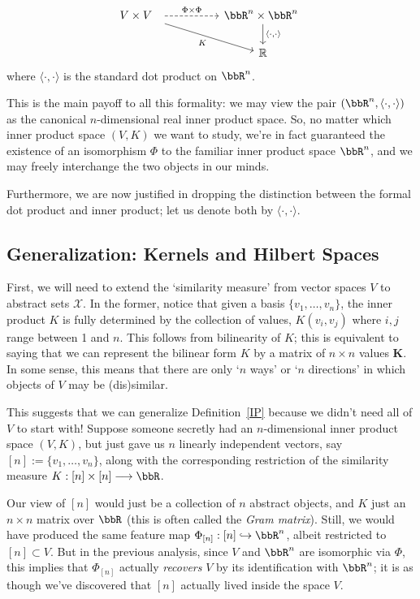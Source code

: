 \documentclass[twoside,11pt]{homework}
\renewcommand{\to}{\longrightarrow}
\begin{document}
\begin{multicols}{2}
\begin{proposition}
  \[\begin{tikzcd}
V \times V\ \  \arrow[dashed, rr, "\Phi \times \Phi"] \arrow[drr, "K"'] & & \bbR^n \times \bbR^n \ \arrow[d, "{\langle\cdot,\cdot \rangle}"] \\
& & \mathbb{R}
\end{tikzcd}
\]
  where $\langle \cdot, \cdot \rangle$ is the standard dot product on $\bbR^n$.
\end{proposition}
This is the main payoff to all this formality: we may view the pair $(\bbR^n, \langle\cdot,\cdot\rangle)$ as the canonical $n$-dimensional real inner product space. So, no matter which inner product space $(V,K)$ we want to study, we're in fact guaranteed the existence of an isomorphism $\Phi$ to the familiar inner product space $\bbR^n$, and we may freely interchange the two objects in our minds.

Furthermore, we are now justified in dropping the distinction between the formal dot product and inner product; let us denote both by $\langle \cdot, \cdot\rangle$.

\subsection{Generalization: Kernels and Hilbert Spaces}
First, we will need to extend the `similarity measure' from vector spaces $V$ to abstract sets $\mathcal{X}$. In the former, notice that given a basis $\{v_1,\dotsc, v_n\}$, the inner product $K$ is fully determined by the collection of values, $K(v_i,v_j)$ where $i,j$ range between 1 and $n$. This follows from bilinearity of $K$; this is equivalent to saying that we can represent the bilinear form $K$ by a matrix of $n\times n$ values $\mathbf{K}$. In some sense, this means that there are only `$n$ ways' or `$n$ directions' in which objects of $V$ may be (dis)similar.

This suggests that we can generalize Definition~\ref{IP} because we didn't need all of $V$ to start with! Suppose someone secretly had an $n$-dimensional inner product space $(V,K)$, but just gave us $n$ linearly independent vectors, say $[n] := \{v_1,\dotsc, v_n\}$, along with the corresponding restriction of the similarity measure $K: [n] \times [n] \to \bbR$.

Our view of $[n]$ would just be a collection of $n$ abstract objects, and $K$ just an $n\times n$ matrix over $\bbR$ (this is often called the \emph{Gram matrix}). Still, we would have produced the same feature map $\Phi_{[n]}: [n] \hookrightarrow \bbR^n$, albeit restricted to $[n]\subset V$. But in the previous analysis, since $V$ and $\bbR^n$ are isomorphic via $\Phi$, this implies that $\Phi_{[n]}$ actually \emph{recovers} $V$ by its identification with $\bbR^n$; it is as though we've discovered that $[n]$ actually lived inside the space $V$.


\end{multicols}
\end{document}

